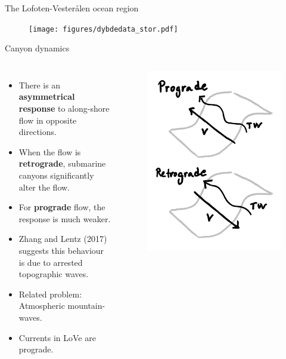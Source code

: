 \documentclass{beamer}
\begin{document}
\begin{frame}{The Lofoten-Vesterålen ocean region}
\begin{figure}
    \centering
    \texttt{[image: figures/dybdedata\_stor.pdf]}
\end{figure}
\end{frame}

\begin{frame}{Canyon dynamics}
\begin{columns}
\begin{itemize}
    \item There is an \textbf{asymmetrical response} to along-shore flow in opposite directions. 
    \item When the flow is \textbf{retrograde}, submarine canyons significantly alter the flow.
    \item For \textbf{prograde} flow, the response is much weaker.
    \item Zhang and Lentz (2017) suggests this behaviour is due to arrested topographic waves.
    \item Related problem: Atmospheric mountain-waves. 
    \item Currents in LoVe are prograde. 
\end{itemize}
\begin{figure}
    \centering
    \includegraphics[width=\linewidth]{figures/prograde_retrograde_sketch.pdf}

\end{figure}
\end{columns}
\end{frame}
\end{document}

